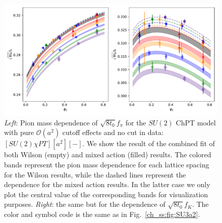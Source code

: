 {\begin{figure}
    \centering
    \includegraphics[width=1.\textwidth]{./cap5/figs/SU2_comb.pdf}
    \caption{\textit{Left}: Pion mass dependence of $\sqrt{8t_0}f_{\pi}$ for the $SU(2)$ ChPT model with pure $\mathcal{O}(a^2)$ cutoff effects and no cut in data: $[SU(2)\chi PT][a^2][-]$. We show the result of the combined fit of both Wilson (empty) and mixed action (filled) results. The colored bands represent the pion mass dependence for each lattice spacing for the Wilson results, while the dashed lines represent the dependence for the mixed action results. In the latter case we only plot the central value of the corresponding bands for visualization purposes. \textit{Right}: the same but for the dependence of $\sqrt{8t_0}f_{K}$. The color and symbol code is the same as in Fig.~\ref{ch_ss:fig:SU3a2}.}
    \label{ch_ss:fig:SU2_comb}
\end{figure}

}

